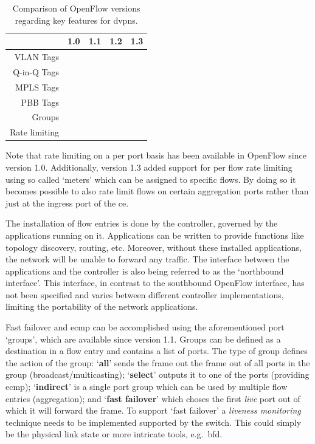 \begin{table}[!h]
	\centering
	\begin{tabular}{r|cccc}
	 			& 1.0 & 1.1 & 1.2 & 1.3 \\
	\hline
	VLAN Tags 	& \checkmark & \checkmark & \checkmark & \checkmark \\
	Q-in-Q Tags &   & \checkmark & \checkmark & \checkmark \\
	MPLS Tags 	&   & \checkmark & \checkmark & \checkmark \\
	PBB Tags 	&   &   &   & \checkmark \\
	Groups 		&   & \checkmark & \checkmark & \checkmark \\
	Rate limiting & \checkmark & \checkmark & \checkmark & \checkmark  \\
	\end{tabular}
	\caption{Comparison of OpenFlow versions regarding key features for \acp{dvpn}.}
	\label{tb:of-versions}	
\end{table}

Note that rate limiting on a per port basis has been available in OpenFlow since version 1.0. Additionally, version 1.3 added support for per flow rate limiting using so called `meters' which can be assigned to specific flows. By doing so it becomes possible to also rate limit flows on certain aggregation ports rather than just at the ingress port of the \ac{ce}.

The installation of flow entries is done by the controller, governed by the applications running on it. Applications can be written to provide functions like topology discovery, routing, etc. Moreover, without these installed applications, the network will be unable to forward any traffic. The interface between the applications and the controller is also being referred to as the `northbound interface'. This interface, in contrast to the southbound OpenFlow interface, has not been specified and varies between different controller implementations, limiting the portability of the network applications.

Fast failover and \ac{ecmp} can be accomplished using the aforementioned port `groups', which are available since version 1.1. Groups can be defined as a destination in a flow entry and contains a list of ports. The type of group defines the action of the group: `\textbf{all}' sends the frame out the frame out of all ports in the group (broadcast/multicasting); `\textbf{select}' outputs it to one of the ports (providing \ac{ecmp}); `\textbf{indirect}' is a single port group which can be used by multiple flow entries (aggregation); and `\textbf{fast failover}' which choses the first \textsl{live} port out of which it will forward the frame. To support `fast failover' a \textsl{liveness monitoring} technique needs to be implemented supported by the switch. This could simply be the physical link state or more intricate tools, e.g.\ \ac{bfd}.

